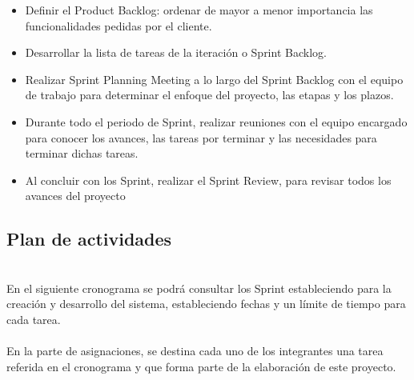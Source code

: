\documentclass[12pt,letterpaper]{article}
\begin{document}
	\begin{itemize}
		\item Definir el Product Backlog:  ordenar de mayor a menor importancia las funcionalidades pedidas por el cliente. 
		
		\item Desarrollar la lista de tareas de la iteración o Sprint Backlog.
		
		\item Realizar Sprint Planning Meeting a lo largo del Sprint Backlog con el equipo de trabajo para determinar el enfoque del proyecto, las etapas y los plazos.
		
		\item Durante todo el periodo de Sprint, realizar reuniones con el equipo encargado para conocer los avances, las tareas por terminar y las necesidades para terminar dichas tareas.
		
		\item Al concluir con los Sprint, realizar el Sprint Review, para revisar todos los avances del proyecto
		
	\end{itemize}
	
	
	\subsection{Plan de actividades}
	
	\\En el siguiente cronograma se podrá consultar los Sprint estableciendo para la creación y desarrollo del sistema, estableciendo fechas y un límite de tiempo para cada tarea.\\ 
	\\En la parte de asignaciones, se destina cada uno de los integrantes una tarea referida en el cronograma y que forma parte de la elaboración de este proyecto. \\
	
\end{document}
